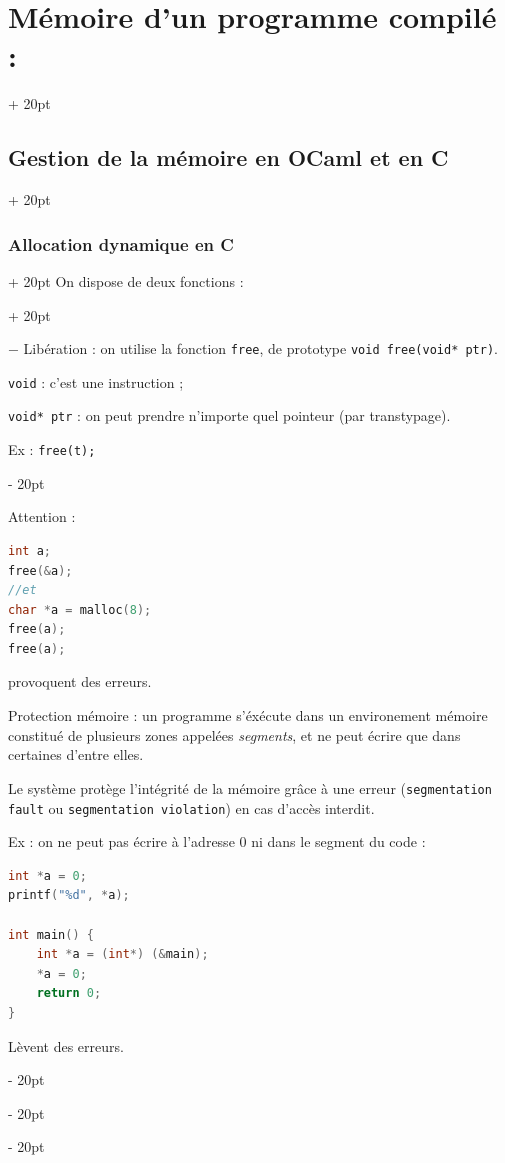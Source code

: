 \documentclass[a4paper, 12pt, twoside]{article}
\renewcommand{\emph}{\textcolor{ff4500}}
\renewcommand{\em}{\color{ff4500}}
\newcommand{\ind}[1][20pt]{\advance\leftskip + #1}
\newcommand{\deind}[1][20pt]{\advance\leftskip - #1}
\newenvironment{indentedenv}[1][20pt]{\par \ind[#1]}{\par \deind}
\newenvironment{indt}[2][20pt]{#2 \begin{indentedenv}[#1]}{\end{indentedenv}} %
\begin{document}
\begin{indt}{\section{Mémoire d'un programme compilé :}}
\begin{indt}{\subsection{Gestion de la mémoire en OCaml et en C}}
\begin{indt}{\subsubsection{Allocation dynamique en C}}
\begin{indt}{On dispose de deux fonctions :}
                    \vspace{12pt}
                    
                    $-$ \emph{Libération} : on utilise la fonction \texttt{\em free}, de prototype \texttt{void free(void* ptr)}.
                    
                    \texttt{void} : c'est une instruction ;
                    
                    \texttt{void* ptr} : on peut prendre n'importe quel pointeur (par transtypage).
                    
                    Ex : \texttt{free(t);}
                \end{indt}
                
                \vspace{12pt}
                
                Attention :
                
                \begin{lstlisting}[language=C, xleftmargin=80pt]
int a;
free(&a);
//et
char *a = malloc(8);
free(a);
free(a);\end{lstlisting}
                
                provoquent des erreurs.
                
                \vspace{12pt}
                
                Protection mémoire : un programme s'éxécute dans un environement mémoire constitué de plusieurs zones appelées \textit{segments}, et ne peut écrire que dans certaines d'entre elles.
                
                Le système protège l'intégrité de la mémoire grâce à une erreur (\texttt{segmentation fault} ou \texttt{segmentation violation}) en cas d'accès interdit.
                
                Ex : on ne peut pas écrire à l'adresse 0 ni dans le segment du code :
                \begin{lstlisting}[language=C, xleftmargin=80pt]
int *a = 0;
printf("%d", *a);

int main() {
    int *a = (int*) (&main);
    *a = 0;
    return 0;
}\end{lstlisting}
                Lèvent des erreurs.
            \end{indt}
            
            \vspace{6pt}
            

\end{indt}
\end{indt}
\end{document}
